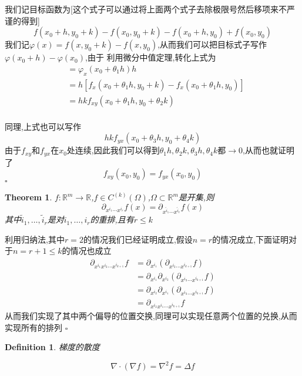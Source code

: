 \documentclass[11pt,hyperref,a4paper,UTF8]{ctexart}
\newtheorem{theorem}{Theorem}[subsection]
\newtheorem{definition}{Definition}[subsection]
\newenvironment{cproof}{%
\heiti{证明}\kaishu
}{%
  \hfill $\square$
  \par\bigskip
}
\newcommand{\RR}{\mathbb{R}}
\newcommand{\parameter}[1]{\left(#1\right)}
\newcommand{\bracket}[1]{\left[#1\right]}
\begin{document}
\begin{CJK}{UTF8}{gkai}
\begin{cproof}
  我们记目标函数为[这个式子可以通过将上面两个式子去除极限号然后移项来不严谨的得到]
  \[f(x_0 +h,y_0 + k) - f(x_0,y_0 + k) - f(x_0 + h,y_0) + f(x_0,y_0)\]
  我们记$\varphi(x) = f(x,y_0 + k) - f(x,y_0)$,从而我们可以把目标式子写作$\varphi(x_0 + h) - \varphi(x_0)$,由于
  利用微分中值定理,转化上式为
  \[
  \begin{aligned}
    &= \varphi_x(x_0 + \theta_1 h)h\\
    &= h\bracket{f_x(x_0 + \theta_1 h,y_0 + k) - f_x(x_0 + \theta_1 h,y_0)}\\
    &= hk f_{xy}(x_0 + \theta_1 h, y_0 + \theta_2 k)\\
  \end{aligned}  
  \]

  同理,上式也可以写作
  \[hk f_{yx}(x_0 + \theta_3 h,y_0 + \theta_4 k)\]
  由于$f_{xy}$和$f_{yx}$在$x_0$处连续,因此我们可以得到$\theta_1 h,\theta_2 k,\theta_3 h,\theta_4 k$都$\to 0$,从而也就证明了
  \[f_{xy}(x_0,y_0) = f_{yx}(x_0,y_0)\]
\end{cproof}
\begin{theorem}
  $f:\RR^m \to \RR$,$f\in C^{(k)}(\Omega)$,$\Omega \subset \RR^m$是开集,则
  \[\partial_{x^{i_1} \cdots x^{i_r}}f(x) = \partial_{x^{\tilde{i}_1} \cdots x^{\tilde{i}_r}}f(x)\]
  其中$\tilde{i}_1,\ldots,\tilde{i}_r$是对$i_1,\ldots,i_r$的重排,且有$r \leq k$
\end{theorem}

\begin{cproof}
  利用归纳法,其中$r = 2$的情况我们已经证明成立,假设$n = r$的情况成立,下面证明对于$n = r + 1 \leq k$的情况也成立
  \[
  \begin{aligned} 
    \partial_{x^{i_1} x^{i_2} \cdots x^{i_{k + 1}}} f &= \partial_{x^{i_1}}\parameter{\partial_{ x^{i_2} \cdots x^{i_{k + 1}}} f}\\
    &=\partial_{x^{i_1} } \partial_{x^{i_2} }\parameter{\partial_{ x^{i_3} \cdots x^{i_{k + 1}}} f}\\
    &=\partial_{x^{i_2} } \partial_{x^{i_1} }\parameter{\partial_{ x^{i_3} \cdots x^{i_{k + 1}}} f}\\
    &= \partial_{x^{i_2} x^{i_1} \cdots x^{i_{k + 1}}} f
  \end{aligned}  
   \]
   从而我们实现了其中两个偏导的位置交换,同理可以实现任意两个位置的兑换,从而实现所有的排列
\end{cproof}

\begin{definition}
  梯度的散度

  \[\nabla \cdot (\nabla f) = \nabla^2 f = \Delta f\]


\end{definition}
\end{CJK}
\end{document}
